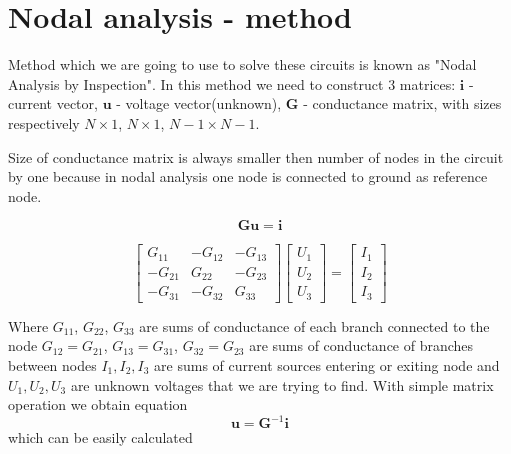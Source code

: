 \documentclass[notitlepage, a4paper, 11pt]{article}
\begin{document}
	\section{Nodal analysis - method}\label{sec:Nodal analysis}
	Method which we are going to use to solve these circuits is known as "Nodal Analysis by Inspection". In this method we need to construct 3 matrices: $\mathbf{i}$ - current vector, $\mathbf{u}$ - voltage vector(unknown), $\mathbf{G}$ - conductance matrix, with sizes respectively $\mathit{N} \times 1$, $\mathit{N} \times 1$, $\mathit{N}-1 \times \mathit{N}-1$.
	
	Size of conductance matrix is always smaller then number of nodes in the circuit by one because in nodal analysis one node is connected to ground as reference node.
	\begin{center} 
		\begin{equation}
			\mathbf{Gu=i}
		\end{equation}
	\end{center}
	
	\begin{center}
		\begin{equation}
			\begin{bmatrix}
				G_{11} & -G_{12} & -G_{13} \\
				-G_{21} & G_{22} & -G_{23} \\
				-G_{31} & -G_{32} & G_{33} 
			\end{bmatrix}
			\begin{bmatrix}
				U_1 \\
				U_2 \\ 
				U_3
			\end{bmatrix}
			=
			\begin{bmatrix}
				I_1 \\
				I_2 \\
				I_3
			\end{bmatrix}
		\end{equation}
	\end{center}
		Where $G_{11}$, $G_{22}$, $G_{33}$ are sums of conductance of each branch connected to the node \newline $G_{12} = G_{21}$, $G_{13} = G_{31}$, $G_{32} = G_{23}$ are sums of conductance of branches between nodes \newline $I_1, I_2, I_3$ are sums of current sources entering or exiting node and $U_1, U_2, U_3$ are unknown voltages that we are trying to find.
		\newline\newline
		With simple matrix operation we obtain equation
		\begin{equation}
			\mathbf{u} = \mathbf{G}^{-1}\mathbf{i}
		\end{equation}
		which can be easily calculated
\end{document}
